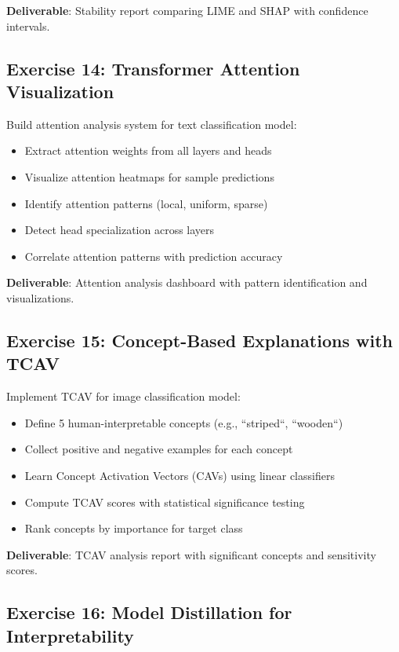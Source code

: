 \textbf{Deliverable}: Stability report comparing LIME and SHAP with confidence intervals.

\subsection{Exercise 14: Transformer Attention Visualization}

Build attention analysis system for text classification model:
\begin{itemize}
    \item Extract attention weights from all layers and heads
    \item Visualize attention heatmaps for sample predictions
    \item Identify attention patterns (local, uniform, sparse)
    \item Detect head specialization across layers
    \item Correlate attention patterns with prediction accuracy
\end{itemize}

\textbf{Deliverable}: Attention analysis dashboard with pattern identification and visualizations.

\subsection{Exercise 15: Concept-Based Explanations with TCAV}

Implement TCAV for image classification model:
\begin{itemize}
    \item Define 5 human-interpretable concepts (e.g., ``striped``, ``wooden``)
    \item Collect positive and negative examples for each concept
    \item Learn Concept Activation Vectors (CAVs) using linear classifiers
    \item Compute TCAV scores with statistical significance testing
    \item Rank concepts by importance for target class
\end{itemize}

\textbf{Deliverable}: TCAV analysis report with significant concepts and sensitivity scores.

\subsection{Exercise 16: Model Distillation for Interpretability}

